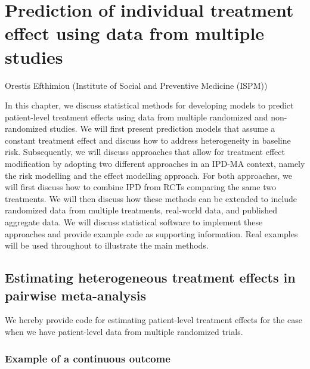 \documentclass[
  letterpaper,
  DIV=11,
  numbers=noendperiod]{scrreprt}
\begin{document}
\hypertarget{prediction-of-individual-treatment-effect-using-data-from-multiple-studies}{%
\chapter{Prediction of individual treatment effect using data from
multiple
studies}\label{prediction-of-individual-treatment-effect-using-data-from-multiple-studies}}

Orestis Efthimiou (Institute of Social and Preventive Medicine (ISPM))

\hfill\break

In this chapter, we discuss statistical methods for developing models to
predict patient-level treatment effects using data from multiple
randomized and non-randomized studies. We will first present prediction
models that assume a constant treatment effect and discuss how to
address heterogeneity in baseline risk. Subsequently, we will discuss
approaches that allow for treatment effect modification by adopting two
different approaches in an IPD-MA context, namely the risk modelling and
the effect modelling approach. For both approaches, we will first
discuss how to combine IPD from RCTs comparing the same two treatments.
We will then discuss how these methods can be extended to include
randomized data from multiple treatments, real-world data, and published
aggregate data. We will discuss statistical software to implement these
approaches and provide example code as supporting information. Real
examples will be used throughout to illustrate the main methods.

\hypertarget{estimating-heterogeneous-treatment-effects-in-pairwise-meta-analysis}{%
\section{Estimating heterogeneous treatment effects in pairwise
meta-analysis}\label{estimating-heterogeneous-treatment-effects-in-pairwise-meta-analysis}}

We hereby provide code for estimating patient-level treatment effects
for the case when we have patient-level data from multiple randomized
trials.

\hypertarget{example-of-a-continuous-outcome}{%
\subsection{Example of a continuous
outcome}\label{example-of-a-continuous-outcome}}
\end{document}
